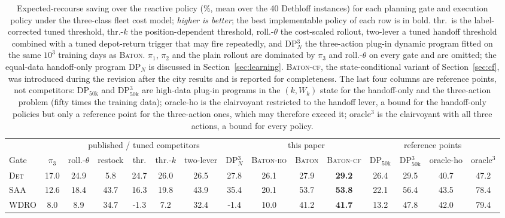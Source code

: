 \begin{table}[t]
\caption{Expected-recourse saving over the reactive policy (\%, mean over
the 40 Dethloff instances) for each planning gate and execution policy
under the three-class fleet cost model; \emph{higher is better}; the
best implementable policy of each row is in bold. thr.\ is the
label-corrected tuned threshold, thr.-$k$ the position-dependent
threshold, roll.-$\theta$ the cost-scaled rollout, two-lever a tuned
handoff threshold combined with a tuned depot-return trigger that may
fire repeatedly, and DP$^3_N$ the three-action plug-in dynamic program
fitted on the same $10^3$ training days as \textsc{Baton}. $\pi_1$,
$\pi_2$ and the plain rollout are dominated by $\pi_3$ and
roll.-$\theta$ on every gate and are omitted; the equal-data
handoff-only program DP$_N$ is discussed in Section~\ref{sec:learning}. \textsc{Baton-cf}, the
state-conditional variant of Section~\ref{sec:cf}, was introduced during
the revision after the city results and is reported for completeness.
The last four columns are reference points, not competitors:
DP$_{50\mathrm{k}}$ and DP$^3_{50\mathrm{k}}$ are high-data plug-in
programs in the $(k, W_k)$ state for the handoff-only and the
three-action problem (fifty times the training data); oracle-ho is the
clairvoyant restricted to the handoff lever, a bound for the handoff-only
policies but only a reference point for the three-action ones, which may
therefore exceed it; oracle$^3$ is the clairvoyant with all three
actions, a bound for every policy.}
\label{tab:grand}
\centering
\footnotesize
\setlength{\tabcolsep}{2.2pt}
\begin{adjustbox}{max width=\linewidth}
\begin{tabular}{l ccccccc ccc cccc}
\toprule
& \multicolumn{7}{c}{published / tuned competitors}
& \multicolumn{3}{c}{this paper} & \multicolumn{4}{c}{reference points} \\
\cmidrule(lr){2-8}\cmidrule(lr){9-11}\cmidrule(lr){12-15}
Gate & $\pi_3$ & roll.-$\theta$ & restock & thr. & thr.-$k$ & two-lever & DP$^3_N$ & \textsc{Baton-ho} & \textsc{Baton} & \textsc{Baton-cf} & DP$_{50\mathrm{k}}$ & DP$^3_{50\mathrm{k}}$ & oracle-ho & oracle$^3$ \\
\midrule
\textsc{Det} & 17.0 & 24.9 & 5.8 & 24.7 & 26.0 & 26.5 & 27.8 & 26.1 & 27.9 & \textbf{29.2} & 26.4 & 29.5 & 40.7 & 47.2 \\
\textsc{SAA} & 12.6 & 18.4 & 43.7 & 16.3 & 19.8 & 43.9 & 35.4 & 20.1 & 53.7 & \textbf{53.8} & 22.1 & 56.4 & 43.5 & 78.4 \\
\textsc{WDRO} & 8.0 & 8.9 & 34.7 & -1.3 & 7.2 & 32.4 & -1.4 & 10.0 & 41.2 & \textbf{41.7} & 13.2 & 47.8 & 42.0 & 79.4 \\

\end{tabular}
\end{adjustbox}
\end{table}
